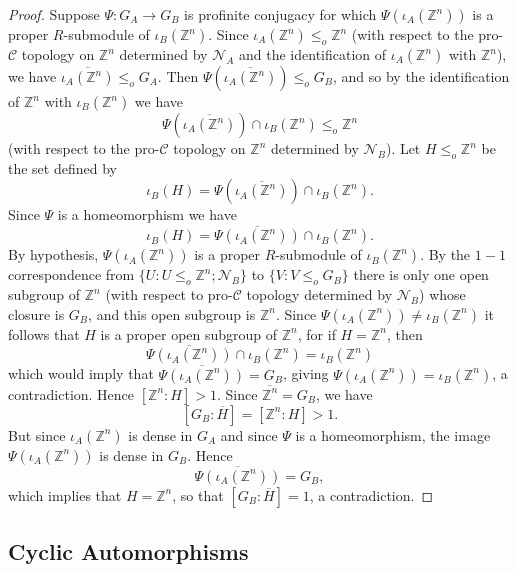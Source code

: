 \documentclass{amsart}
\theoremstyle{plain}
\theoremstyle{definition}
\theoremstyle{remark}
\begin{document}
\begin{proof} Suppose $\Psi:G_A\to G_B$ is profinite conjugacy for which $\Psi(\iota_A({\mathbb Z}^n))$ is a proper $R$-submodule of $\iota_B({\mathbb Z}^n)$. Since $\iota_A({\mathbb Z}^n)\leq_o {\mathbb Z}^n$ (with respect to the pro-${\mathcal C}$ topology on ${\mathbb Z}^n$ determined by ${\mathcal N}_A$ and the identification of $\iota_A({\mathbb Z}^n)$ with ${\mathbb Z}^n$), we have $\overline{\iota_A({\mathbb Z}^n)} \leq_o G_A$. Then $\Psi\left( \overline{\iota_A({\mathbb Z}^n)}\right) \leq_o G_B$, and so by the identification of ${\mathbb Z}^n$ with $\iota_B({\mathbb Z}^n)$ we have
\[ \Psi\left( \overline{\iota_A({\mathbb Z}^n)}\right) \cap \iota_B({\mathbb Z}^n)\leq_o {\mathbb Z}^n\]
(with respect to the pro-${\mathcal C}$ topology on ${\mathbb Z}^n$ determined by ${\mathcal N}_B$). Let $H\leq_o {\mathbb Z}^n$ be the set defined by
\[ \iota_B(H) = \Psi\left( \overline{\iota_A({\mathbb Z}^n)}\right) \cap \iota_B({\mathbb Z}^n).\]
Since $\Psi$ is a homeomorphism we have
\[ \iota_B (H)  = \overline{ \Psi(\iota_A({\mathbb Z}^n))} \cap \iota_B({\mathbb Z}^n).\]
By hypothesis, $\Psi(\iota_A({\mathbb Z}^n))$ is a proper $R$-submodule of $\iota_B({\mathbb Z}^n)$. By the $1-1$ correspondence from $\{ U: U\leq_o {\mathbb Z}^n; {\mathcal N}_B\}$ to $\{ V:V\leq_o G_B\}$ there is only one open subgroup of ${\mathbb Z}^n$ (with respect to pro-${\mathcal C}$ topology determined by ${\mathcal N}_B$) whose closure is $G_B$, and this open subgroup is ${\mathbb Z}^n$. Since $\Psi(\iota_A({\mathbb Z}^n))\ne \iota_B({\mathbb Z}^n)$ it follows that $H$ is a proper open subgroup of ${\mathbb Z}^n$, for if $H={\mathbb Z}^n$, then
\[ \overline{ \Psi(\iota_A({\mathbb Z}^n)) }\cap \iota_B({\mathbb Z}^n) = \iota_B({\mathbb Z}^n)\]
which would imply that $\overline{\Psi(\iota_A({\mathbb Z}^n))} = G_B$, giving $\Psi(\iota_A({\mathbb Z}^n)) = \iota_B({\mathbb Z}^n)$, a contradiction. Hence $[{\mathbb Z}^n:H]>1$. Since $\overline{{\mathbb Z}^n}=G_B$, we have
\[ [G_B:\overline{H}] = [{\mathbb Z}^n:H]>1.\]
But since $\iota_A({\mathbb Z}^n)$ is dense in $G_A$ and since $\Psi$ is a homeomorphism, the image $\Psi(\iota_A({\mathbb Z}^n))$ is dense in $G_B$. Hence
\[ \overline{\Psi(\iota_A({\mathbb Z}^n))} = G_B,\]
which implies that $H = {\mathbb Z}^n$, so that $[G_B:\overline{H}] = 1$, a contradiction.
\end{proof}


\subsection{Cyclic Automorphisms}
\end{document}
